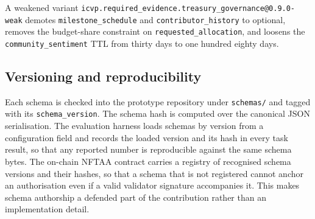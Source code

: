 A weakened variant \texttt{icvp.required\_evidence.treasury\_governance@0.9.0-weak} demotes \texttt{milestone\_schedule} and \texttt{contributor\_history} to optional, removes the budget-share constraint on \texttt{requested\_allocation}, and loosens the \texttt{community\_sentiment} TTL from thirty days to one hundred eighty days.

\subsection{Versioning and reproducibility}

Each schema is checked into the prototype repository under \texttt{schemas/} and tagged with its \texttt{schema\_version}. The schema hash is computed over the canonical JSON serialisation. The evaluation harness loads schemas by version from a configuration field and records the loaded version and its hash in every task result, so that any reported number is reproducible against the same schema bytes. The on-chain NFTAA contract carries a registry of recognised schema versions and their hashes, so that a schema that is not registered cannot anchor an authorisation even if a valid validator signature accompanies it. This makes schema authorship a defended part of the contribution rather than an implementation detail.
